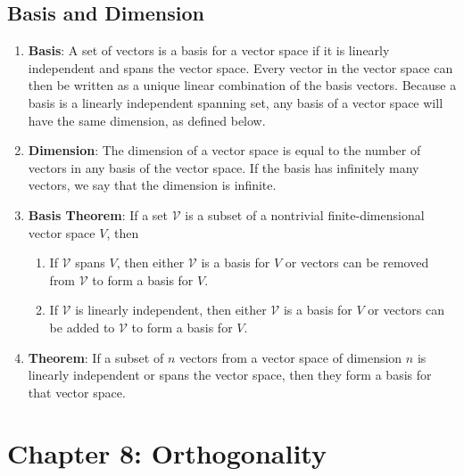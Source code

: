 \documentclass[10pt]{article}
\begin{document}
\subsection{Basis and Dimension}
\begin{enumerate}
\item \textbf{Basis}: A set of vectors is a basis for a vector space if it is linearly independent and spans the vector space. Every vector in the vector space can then be written as a unique linear combination of the basis vectors. Because a basis is a linearly independent spanning set, any basis of a vector space will have the same dimension, as defined below.
\item \textbf{Dimension}: The dimension of a vector space is equal to the number of vectors in any basis of the vector space. If the basis has infinitely many vectors, we say that the dimension is infinite. 
\item \textbf{Basis Theorem}: If a set $\mathcal{V}$ is a subset of a nontrivial finite-dimensional vector space $V$, then 
\begin{enumerate}
\item If $\mathcal{V}$ spans $V$, then either $\mathcal{V}$ is a basis for $V$ or vectors can be removed from $\mathcal{V}$ to form a basis for $V$.
\item If $\mathcal{V}$ is linearly independent, then either $\mathcal{V}$ is a basis for $V$ or vectors can be added to $\mathcal{V}$ to form a basis for $V$.
\end{enumerate}
\item \textbf{Theorem}: If a subset of $n$ vectors from a vector space of dimension $n$ is linearly independent or spans the vector space, then they form a basis for that vector space.
\end{enumerate}
\section{Chapter 8: Orthogonality}
\end{document}
